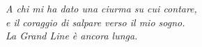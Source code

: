 \chapter*{}
\thispagestyle{empty}
\vspace*{\fill}
\begin{flushright}
  \itshape
  A chi mi ha dato una ciurma su cui contare,\\
  e il coraggio di salpare verso il mio sogno. \\
  La Grand Line è ancora lunga.
\end{flushright}
\vspace*{\fill}